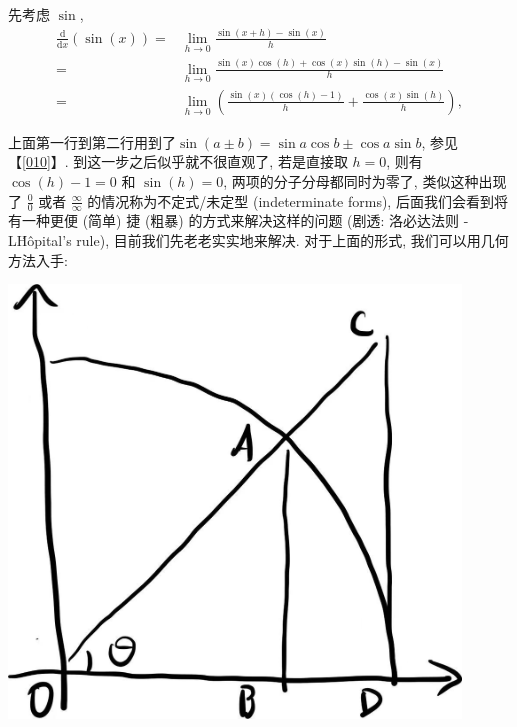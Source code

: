 \begin{tcolorbox}[size=fbox, breakable, enhanced jigsaw, title={三角函数}]

先考虑 $\sin$,
\begin{align*}
\frac{\mathrm{d}}{\mathrm{d}x}(\sin(x))=&\lim_{h\rightarrow0}\frac{\sin(x+h)-\sin(x)}{h}\\
=&\lim_{h\rightarrow0}\frac{\sin(x)\cos(h)+\cos(x)\sin(h)-\sin(x)}{h}\\
=&\lim_{h\rightarrow0}\left(\frac{\sin(x)(\cos(h)-1)}{h}+\frac{\cos(x)\sin(h)}{h}\right),
\end{align*}

上面第一行到第二行用到了$\sin(a\pm b)=\sin a\cos b\pm \cos a\sin b$, 参见【\ref{010}】. 到这一步之后似乎就不很直观了, 若是直接取 $h=0$, 则有 $\cos(h)-1=0$ 和
$\sin(h)=0$, 两项的分子分母都同时为零了, 类似这种出现了
$\frac{0}{0}$ 或者 $\frac{\infty}{\infty}$ 的情况称为不定式/未定型
(indeterminate forms), 后面我们会看到将有一种更便 (简单) 捷 (粗暴)
的方式来解决这样的问题 (剧透: 洛必达法则 - L\'H\^{o}pital's rule),
目前我们先老老实实地来解决. 对于上面的形式, 我们可以用几何方法入手:

\begin{tcolorbox}[size=fbox, breakable, enhanced jigsaw, sidebyside]
\includegraphics[width=0.9\textwidth]{img/image-20230529100555673.png}
\tcblower
{}
\end{tcolorbox}


\end{tcolorbox}
